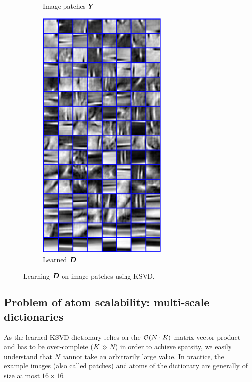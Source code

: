 \begin{figure}[!ht]
\begin{subfigure}[b]{0.29\textwidth}
	\caption{Image patches $\bm{Y}$}\label{fig_ksvd_patches}
\end{subfigure}
\begin{subfigure}[b]{0.29\textwidth}\centering
	\includegraphics[width=0.7\textwidth]{figures/ksvd/dictionary.pdf}
	\caption{Learned $\bm{D}$}\label{fig_ksvd_dict}
\end{subfigure}
\caption{Learning $\bm{D}$ on image patches using \ac{KSVD}.}\label{fig_ksvd}
\end{figure}


\subsection{Problem of atom scalability: multi-scale dictionaries}
As the learned \ac{KSVD} dictionary relies on the $\mathcal{O}(N \cdot K)$ matrix-vector product and has to be over-complete ($K \gg N$) in order to achieve sparsity, we easily understand that $N$ cannot take an arbitrarily large value. In practice, the example images (also called patches) and atoms of the dictionary are generally of size at most $16 \times 16$.

